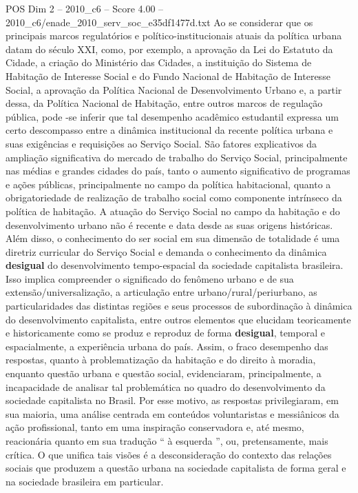\begin{textsample}{POS Dim 2 – 2010\_c6 – Score 4.00 – 2010\_c6/enade\_2010\_serv\_soc\_e35df1477d.txt}
Ao se considerar que os principais marcos regulatórios e político-institucionais atuais da política urbana datam do século XXI, como, por exemplo, a aprovação da Lei do Estatuto da Cidade, a criação do Ministério das Cidades, a instituição do Sistema de Habitação de Interesse Social e do Fundo Nacional de Habitação de Interesse Social, a aprovação da Política Nacional de Desenvolvimento Urbano e, a partir dessa, da Política Nacional de Habitação, entre outros marcos de regulação pública, pode -se inferir que tal desempenho acadêmico estudantil expressa um certo descompasso entre a dinâmica institucional da recente política urbana e suas exigências e requisições ao Serviço Social.
São fatores explicativos da ampliação significativa do mercado de trabalho do Serviço Social, principalmente nas médias e grandes cidades do país, tanto o aumento significativo de programas e ações públicas, principalmente no campo da política habitacional, quanto a obrigatoriedade de realização de trabalho social como componente intrínseco da política de habitação.
A atuação do Serviço Social no campo da habitação e do desenvolvimento urbano não é recente e data desde as suas origens históricas.
Além disso, o conhecimento do ser social em sua dimensão de totalidade é uma diretriz curricular do Serviço Social e demanda o conhecimento da dinâmica \textbf{desigual} do desenvolvimento tempo-espacial da sociedade capitalista brasileira.
Isso implica compreender o significado do fenômeno urbano e de sua extensão/universalização, a articulação entre urbano/rural/periurbano, as particularidades das distintas regiões e seus processos de subordinação à dinâmica do desenvolvimento capitalista, entre outros elementos que elucidam teoricamente e historicamente como se produz e reproduz de forma \textbf{desigual}, temporal e espacialmente, a experiência urbana do país.
Assim, o fraco desempenho das respostas, quanto à problematização da habitação e do direito à moradia, enquanto questão urbana e questão social, evidenciaram, principalmente, a incapacidade de analisar tal problemática no quadro do desenvolvimento da sociedade capitalista no Brasil.
Por esse motivo, as respostas privilegiaram, em sua maioria, uma análise centrada em conteúdos voluntaristas e messiânicos da ação profissional, tanto em uma inspiração conservadora e, até mesmo, reacionária quanto em sua tradução “ à esquerda ”, ou, pretensamente, mais crítica.
O que unifica tais visões é a desconsideração do contexto das relações sociais que produzem a questão urbana na sociedade capitalista de forma geral e na sociedade brasileira em particular.

\end{textsample}
